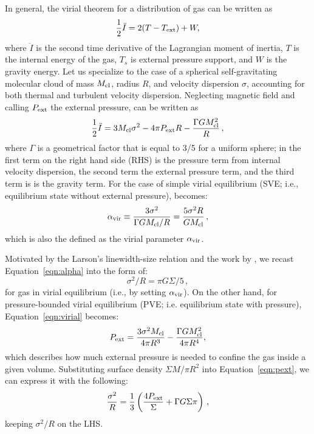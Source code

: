 \IfFileExists{emulateapjlegacy.cls}{\documentclass[iop]{emulateapjlegacy}}{\documentclass[iop]{emulateapj}}
\begin{document}
In general, the virial theorem for a distribution of gas can be written as
\begin{equation}\label{eqn:virial_th_general}
\frac{1}{2}\ddot I = 2(T - T_{\rm ext}) + W,
\end{equation}
where $\ddot I$ is the second time derivative of the Lagrangian moment of inertia, $T$ is the internal energy of the gas, $T_s$ is external pressure support, and $W$ is the gravity energy.
%
Let us specialize to the case of a spherical self-gravitating molecular cloud of mass $M_{\rm cl}$, radius $R$, and velocity dispersion $\sigma$, accounting for both thermal and turbulent velocity dispersion. Neglecting magnetic field and calling $P_{\rm ext}$ the external pressure,  can be written as
\begin{equation}
\frac{1}{2}\ddot I = 3 M_{\rm cl} \sigma^2 - 4\pi P_{\rm ext} R - \frac{\Gamma GM_{\rm cl}^2}{R}\,,
\label{eqn:virial}
\end{equation}
where $\Gamma$ is a geometrical factor that is equal to 3/5 for a uniform sphere; in  the first term on the right hand side (RHS) is the pressure term from internal velocity dispersion, the second term the external pressure term, and the third term is is the gravity term. For the case of simple virial equilibrium (SVE; i.e., equilibrium state without external pressure),  becomes:
\begin{equation}
\alpha_{\rm vir} \equiv \frac{3\sigma^2}{\Gamma GM_{\rm cl}/R} = \frac{5\sigma^2R}{GM_{\rm cl}}\,,
\label{eqn:alpha}
\end{equation}
which is also the defined as the virial parameter $\alpha_{\rm vir}$.

Motivated by the Larson's linewidth-size relation \citep{Larson81a} and the work by \citet{Heyer09a},
we recast Equation~\ref{eqn:alpha} into the form of:
\begin{equation}
\sigma^2/R = \pi G \Sigma/5\,,
\label{eqn:SVE}
\end{equation}
for gas in virial equilibrium (i.e., by setting $\alpha_{\rm vir}$).
On the other hand, for pressure-bounded virial equilibrium (PVE; i.e. equilibrium state with pressure), %
Equation~\ref{eqn:virial} becomes:
\begin{equation}
P_{\rm ext} = \frac{3\sigma^2M_{\rm cl}}{4\pi R^3} - \frac{\Gamma G M_{\rm cl}^2}{4\pi R^4},
\label{eqn:pext}
\end{equation}
which describes how much external pressure is needed to confine the gas inside a given volume.
Substituting surface density $\Sigma$\eq$M/\pi R^2$ into Equation~\ref{eqn:pext}, we can express it with the following:
\begin{equation}
\frac{\sigma^2}{R} = \frac{1}{3}\left(\frac{4P_{\rm ext}}{\Sigma} + \Gamma G \Sigma \pi \right)\,,
\label{eqn:v0}
\end{equation}
keeping $\sigma^2/R$ on the LHS.
\end{document}
